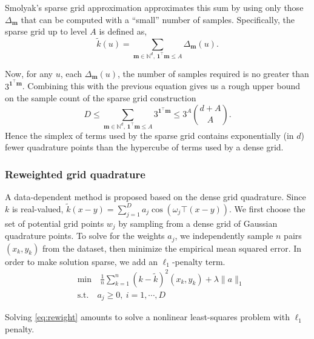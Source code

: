 \documentclass[conference]{IEEEtran}
\newcommand{\N}{\mathbb{N}}
\DeclareMathOperator{\1}{\mathbf{1}}
\theoremstyle{definition}
\begin{document}
Smolyak's sparse grid approximation
approximates this sum by using only those $\Delta_{\mathbf{m}}$ that can
be computed with a ``small'' number of samples.  Specifically, the sparse
grid up to level $A$ is defined as,
\[
  \tilde{k}(u) = \sum_{\mathbf{m} \in \N^d, \, \mathbf{1}^\top \mathbf{m} \le A} \Delta_{\mathbf{m}}(u).
\]

Now, for any $u$, each $\Delta_{\mathbf{m}}(u)$, the number of samples
required is no greater than $3^{\mathbf{1}^\top \mathbf{m}}$.
Combining this with the previous equation gives us a rough upper bound on the
sample count of the sparse grid construction
\[
  D \le \sum_{\mathbf{m} \in \N^d, \, \mathbf{1}^\top \mathbf{m} \le A} 3^{\mathbf{1}^\top
    \mathbf{m}} \le 3^A {d + A \choose A}.
\]
Hence the simplex of terms used by the sparse grid contains exponentially (in $d$)
fewer quadrature points than the hypercube of terms used by a dense grid.



\subsubsection{Reweighted grid quadrature}
A data-dependent method is proposed based on the dense grid quadrature. Since $k$ is real-valued, $\tilde{k}(x-y)=\sum_{j=1}^D a_j \cos(\omega_j\top (x-y))$. We first choose the set of potential grid points $w_j$ by sampling from a dense grid of Gaussian quadrature points. To solve for the weights $a_j$, we
independently sample $n$ pairs $(x_k, y_k)$ from the dataset, then minimize the empirical mean squared error. In order to make solution sparse, we add an $\ell_1$-penalty term. 
\begin{subequations}
    \label{eq:rewight}
    \begin{align}
        &\text{min}\quad \frac{1}{n}\sum_{k=1}^n (k-\tilde{k})^2(x_k,y_k)+\lambda \|a\|_1\\
&\text{s.t.}\quad a_j \geq 0,\ i = 1,\cdots, D
    \end{align}
\end{subequations}

Solving \ref{eq:rewight} amounts to solve a nonlinear least-squares problem with $\ell_1$ penalty. 


\end{document}
